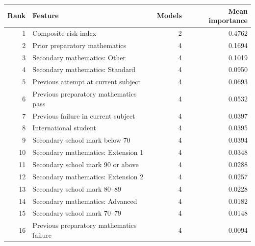 \begin{tabular}{rlrr}
\toprule
Rank & Feature & Models & Mean importance \\
\midrule
1 & Composite risk index & 2 & 0.4762 \\
2 & Prior preparatory mathematics & 4 & 0.1694 \\
3 & Secondary mathematics: Other & 4 & 0.1019 \\
4 & Secondary mathematics: Standard & 4 & 0.0950 \\
5 & Previous attempt at current subject & 4 & 0.0693 \\
6 & Previous preparatory mathematics pass & 4 & 0.0532 \\
7 & Previous failure in current subject & 4 & 0.0397 \\
8 & International student & 4 & 0.0395 \\
9 & Secondary school mark below 70 & 4 & 0.0394 \\
10 & Secondary mathematics: Extension 1 & 4 & 0.0348 \\
11 & Secondary school mark 90 or above & 4 & 0.0288 \\
12 & Secondary mathematics: Extension 2 & 4 & 0.0257 \\
13 & Secondary school mark 80–89 & 4 & 0.0228 \\
14 & Secondary mathematics: Advanced & 4 & 0.0182 \\
15 & Secondary school mark 70–79 & 4 & 0.0148 \\
16 & Previous preparatory mathematics failure & 4 & 0.0094 \\
\bottomrule
\end{tabular}
